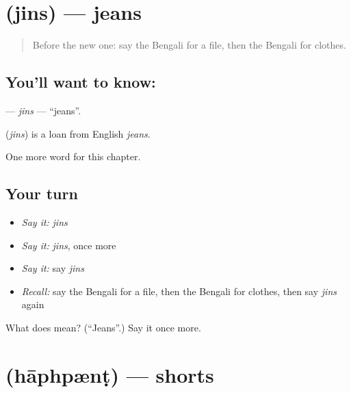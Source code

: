 \section[\texorpdfstring{\bn{জিনস} (jins)}{জিনস (jins)}]{ (jins) — jeans}

\label{lesson:BN-C164-jins}



\begin{quote}
Before the new one: say the Bengali for a file, then the Bengali for clothes.
\end{quote}

\subsection*{You'll want to know: }
\textbf{} — \emph{jins} — \textquotedblleft{}jeans\textquotedblright{}.

\begin{cousinweb}
\textbf{} (\emph{jins}) is a loan from English \emph{jeans}.
\end{cousinweb}

\begin{grammarlens}[title={What you've built}]
One more word for this chapter.
\end{grammarlens}

\subsection*{Your turn}
\begin{itemize}
\raggedright
  \item \emph{Say it:} \emph{jins}
  \item \emph{Say it:} \emph{jins}, once more
  \item \emph{Say it:} say \emph{jins}
  \item \emph{Recall:} say the Bengali for a file, then the Bengali for clothes, then say \emph{jins} again
\end{itemize}

\begin{tcolorbox}[breakable,colback=teal!4,colframe=teal!35!black,title={Before you move on}]
What does  mean? (\textquotedblleft{}Jeans\textquotedblright{}.) Say it once more.
\end{tcolorbox}
\section[\texorpdfstring{\bn{হাফপ্যান্ট} (hāphpænṭ)}{হাফপ্যান্ট (hāphpænṭ)}]{ (hāphpænṭ) — shorts}


